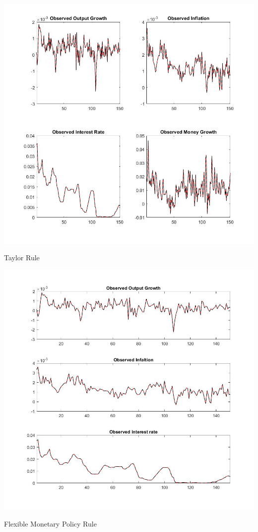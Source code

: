 \documentclass[11pt,preprint, authoryear]{elsarticle}
\let\origfigure\figure
\let\endorigfigure\endfigure
\renewenvironment{figure}[1][2] {
    \expandafter\origfigure\expandafter[H]
} {
    \endorigfigure
}
\numberwithin{equation}{section}
\numberwithin{figure}{section}
\numberwithin{table}{section}
\begin{document}
\begin{figure}
    \centering 
    \begin{minipage}[t]{8.2cm} 
        \centering 
        \includegraphics[width=\linewidth]{tay_hs.jpg} 
        \caption{Taylor Rule}
    \end{minipage} 
    \hspace{0.1cm} 
    \begin{minipage}[t]{8.2cm} 
        \centering 
        \includegraphics[width=\linewidth]{flex_hs.jpg} 
        \caption{Flexible Monetary Policy Rule}
    \end{minipage}
    \caption{Historical and Smooth Variables}
    \label{hs}
\end{figure}
\end{document}
